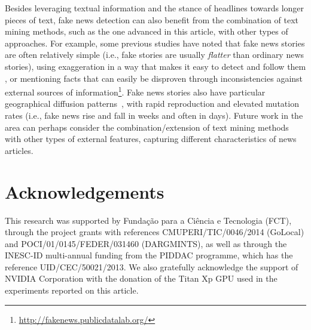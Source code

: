 Besides leveraging textual information and the stance of headlines towards longer pieces of text, fake news detection can also benefit from the combination of text mining methods, such as the one advanced in this article, with other types of approaches. For example, some previous studies have noted that fake news stories are often relatively simple (i.e., fake stories are usually \textit{flatter} than ordinary news stories), using exaggeration in a way that makes it easy to detect and follow them \cite{alternative}, or mentioning facts that can easily be disproven through inconsistencies against external sources of information\footnote{\scriptsize{\url{http://fakenews.publicdatalab.org/}}}. Fake news stories also have particular geographical diffusion patterns~\cite{alternative}, with rapid reproduction and elevated mutation rates (i.e., fake news rise and fall in weeks and often in days). Future work in the area can perhaps consider the combination/extension of text mining methods with other types of external features, capturing different characteristics of news articles.

\section*{Acknowledgements}

This research was supported by Funda\c{c}\~{a}o para a Ci\^{e}ncia e Tecnologia (FCT), through the project grants with references CMUPERI/TIC/0046/2014 (GoLocal) and POCI/01/0145/FEDER/031460 (DARGMINTS), as well as through the INESC-ID multi-annual funding from the PIDDAC programme, which has the reference UID/CEC/50021/2013. We also gratefully acknowledge the support of NVIDIA Corporation with the donation of the Titan Xp GPU used in the experiments reported on this article.



